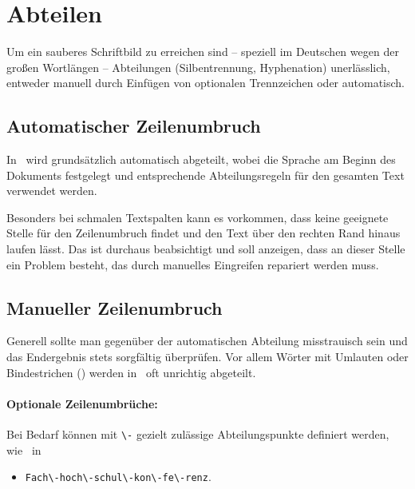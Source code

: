 \section{Abteilen}
\label{subsec:layout-abteilen}

Um ein sauberes Schriftbild zu erreichen sind -- speziell im
Deutschen wegen der großen Wortlängen -- Abteilungen
(Silbentrennung, Hyphenation) unerlässlich, entweder manuell durch
Einfügen von optionalen Trennzeichen oder automatisch. 


\subsection{Automatischer Zeilenumbruch}

In \latex\ wird grundsätzlich automatisch abgeteilt, wobei die Sprache am
Beginn des Dokuments festgelegt und entsprechende Abteilungsregeln
für den gesamten Text verwendet werden.

Besonders bei schmalen Textspalten kann es vorkommen, dass \latex
keine geeignete Stelle für den Zeilenumbruch findet und den Text
über den rechten Rand hinaus laufen lässt. Das ist durchaus
beabsichtigt und soll anzeigen, dass an dieser Stelle ein Problem
besteht, das durch manuelles Eingreifen repariert werden muss.



\subsection{Manueller Zeilenumbruch}

Generell sollte man gegenüber der automatischen Abteilung
misstrauisch sein und das Endergebnis stets sorgfältig überprüfen.
Vor allem Wörter mit Umlauten oder Bindestrichen (\su) werden in \latex\ 
oft unrichtig abgeteilt.


\paragraph{Optionale Zeilenumbrüche:} 
Bei Bedarf können mit \verb!\-! gezielt zulässige Abteilungspunkte 
definiert werden, wie \zB\ in
%
\begin{itemize}
\item[] \verb!Fach\-hoch\-schul\-kon\-fe\-renz!.
\end{itemize}

